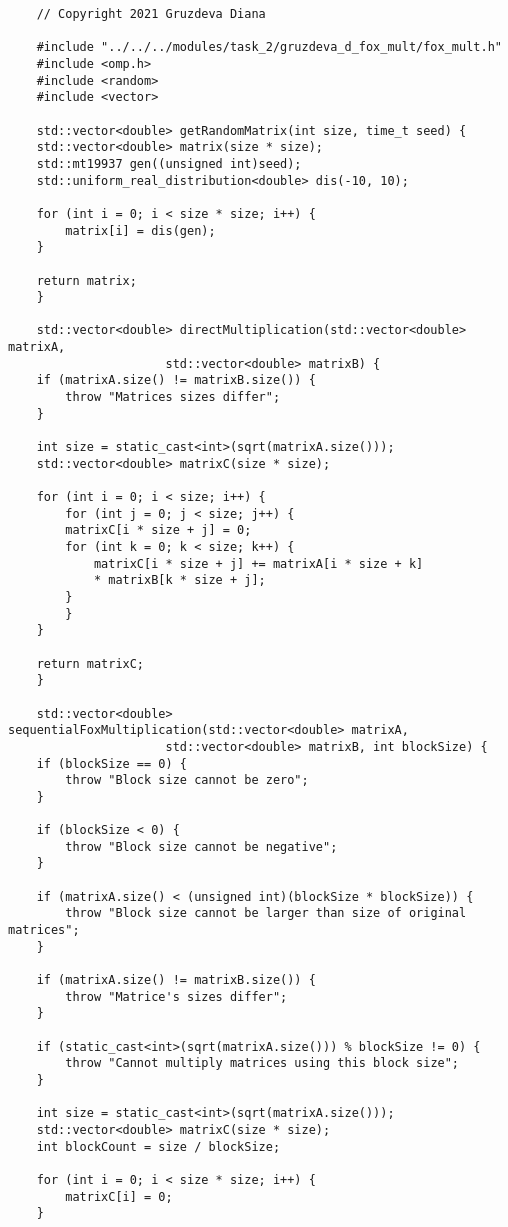 \documentclass{article}
\begin{document}
\begin{lstlisting}
	// Copyright 2021 Gruzdeva Diana

	#include "../../../modules/task_2/gruzdeva_d_fox_mult/fox_mult.h"
	#include <omp.h>
	#include <random>
	#include <vector>

	std::vector<double> getRandomMatrix(int size, time_t seed) {
  	std::vector<double> matrix(size * size);
  	std::mt19937 gen((unsigned int)seed);
  	std::uniform_real_distribution<double> dis(-10, 10);

  	for (int i = 0; i < size * size; i++) {
    	matrix[i] = dis(gen);
  	}

  	return matrix;
	}

	std::vector<double> directMultiplication(std::vector<double> matrixA,
  	                  std::vector<double> matrixB) {
  	if (matrixA.size() != matrixB.size()) {
    	throw "Matrices sizes differ";
  	}

  	int size = static_cast<int>(sqrt(matrixA.size()));
  	std::vector<double> matrixC(size * size);

  	for (int i = 0; i < size; i++) {
    	for (int j = 0; j < size; j++) {
      	matrixC[i * size + j] = 0;
      	for (int k = 0; k < size; k++) {
        	matrixC[i * size + j] += matrixA[i * size + k]
        	* matrixB[k * size + j];
      	}
    	}
  	}

  	return matrixC;
	}

	std::vector<double> sequentialFoxMultiplication(std::vector<double> matrixA,
  	                  std::vector<double> matrixB, int blockSize) {
  	if (blockSize == 0) {
    	throw "Block size cannot be zero";
  	}

  	if (blockSize < 0) {
    	throw "Block size cannot be negative";
  	}

  	if (matrixA.size() < (unsigned int)(blockSize * blockSize)) {
    	throw "Block size cannot be larger than size of original matrices";
  	}

  	if (matrixA.size() != matrixB.size()) {
    	throw "Matrice's sizes differ";
  	}

  	if (static_cast<int>(sqrt(matrixA.size())) % blockSize != 0) {
    	throw "Cannot multiply matrices using this block size";
  	}

  	int size = static_cast<int>(sqrt(matrixA.size()));
  	std::vector<double> matrixC(size * size);
  	int blockCount = size / blockSize;

  	for (int i = 0; i < size * size; i++) {
    	matrixC[i] = 0;
  	}


\end{lstlisting}
\end{document}
